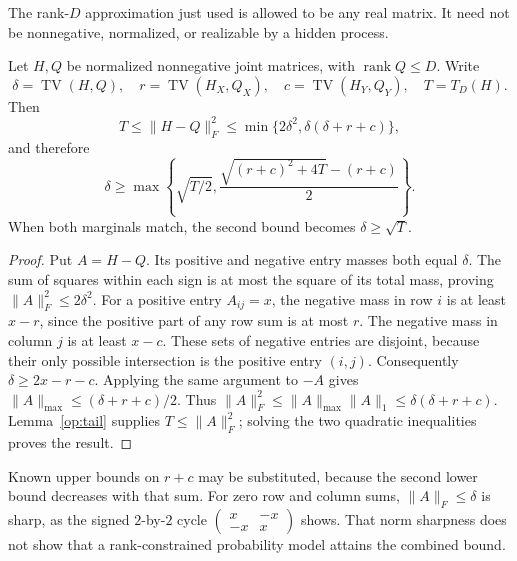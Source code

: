 The rank-\(D\) approximation just used is allowed to be any real matrix.
It need not be nonnegative, normalized, or realizable by a hidden process.

\begin{theorem}
\label{op:marginal-rank}
Let \(H,Q\) be normalized nonnegative joint matrices, with
\(\operatorname{rank}Q\le D\).  Write
\[
 \delta=\operatorname{TV}(H,Q),\quad
 r=\operatorname{TV}(H_X,Q_X),\quad
 c=\operatorname{TV}(H_Y,Q_Y),\quad T=T_D(H).
\]
Then
\[
 T\le\|H-Q\|_F^2\le
 \min\{2\delta^2,\delta(\delta+r+c)\},
\]
and therefore
\[
 \delta\ge
 \max\left\{\sqrt{T/2},
 \frac{\sqrt{(r+c)^2+4T}-(r+c)}2\right\}.
\]
When both marginals match, the second bound becomes \(\delta\ge\sqrt T\).
\end{theorem}
\begin{proof}
Put \(A=H-Q\).  Its positive and negative entry masses both equal
\(\delta\).  The sum of squares within each sign is at most the square
of its total mass, proving \(\|A\|_F^2\le2\delta^2\).
For a positive entry \(A_{ij}=x\), the negative mass in row \(i\) is at
least \(x-r\), since the positive part of any row sum is at most \(r\).
The negative mass in column \(j\) is at least \(x-c\).
These sets of negative entries are disjoint, because their only possible
intersection is the positive entry \((i,j)\).  Consequently
\(\delta\ge2x-r-c\).  Applying the same argument to \(-A\) gives
\(\|A\|_{\max}\le(\delta+r+c)/2\).
Thus \(\|A\|_F^2\le\|A\|_{\max}\|A\|_1
\le\delta(\delta+r+c)\).
Lemma~\ref{op:tail} supplies \(T\le\|A\|_F^2\);
solving the two quadratic inequalities proves the result.
\end{proof}

Known upper bounds on \(r+c\) may be substituted, because the second
lower bound decreases with that sum.  For zero row and column sums,
\(\|A\|_F\le\delta\) is sharp, as the signed \(2\)-by-\(2\) cycle
\(\left(\begin{smallmatrix}x&-x\\-x&x\end{smallmatrix}\right)\) shows.
That norm sharpness does not show that a rank-constrained probability
model attains the combined bound.


